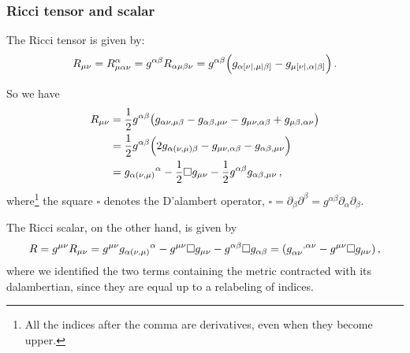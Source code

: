 \documentclass[main.tex]{subfiles}
\begin{document}
\subsubsection{Ricci tensor and scalar}

The Ricci tensor is given by: 
%
\begin{equation}
  R_{\mu \nu } = R^{\alpha }_{\mu \alpha \nu } 
  = g^{\alpha \beta }R_{\alpha \mu \beta \nu }
  = g^{\alpha \beta }\qty(g_{\alpha [\nu|, \mu | \beta ]} - g_{\mu [\nu|, \alpha | \beta ]})
\,.
\end{equation}
%


So we have 
%
\begin{subequations}
    \begin{align}
    R_{\mu \nu }
    &= \frac{1}{2} g^{\alpha \beta }\qty(
      g_{\alpha \nu , \mu \beta }
      -g_{\alpha \beta , \mu \nu }
      - g_{\mu \nu , \alpha \beta }
      + g_{\mu \beta , \alpha \nu }
    )  \\
    &= \frac{1}{2} g^{\alpha \beta }\qty(
      2 g_{\alpha (\nu , \mu ) \beta }
      - g_{\mu \nu , \alpha \beta }
      - g_{\alpha \beta , \mu \nu }
    )  \\
    &= g_{\alpha (\nu , \mu )}\,\!^{\alpha } 
    - \frac{1}{2} \square g_{\mu \nu }
    - \frac{1}{2} g^{\alpha \beta }g_{\alpha \beta , \mu \nu }
    \label{eq:Ricci-tensor-LIF}
\,,
\end{align}
\end{subequations}
%
where\footnote{All the indices after the comma are derivatives, even when they become upper.} the square \(\square\) denotes the D'alambert operator, \(\square = \partial_{\beta }\partial^{\beta } = g^{\alpha \beta }\partial_{\alpha }\partial_{\beta }\).

The Ricci scalar, on the other hand, is given by 
%
\begin{equation} \label{eq:ricci-scalar-LIF} 
  R = g^{\mu \nu }R_{\mu \nu }
  =  g^{\mu \nu }g_{\alpha (\nu , \mu )}\,\!^{\alpha }
  -  g^{\mu \nu }\square g_{\mu \nu }
  - g^{\alpha \beta } \square g_{\alpha \beta }
  = (\tensor{g}{_{\alpha \nu }^{, \alpha \nu }}
   -g^{\mu \nu } \square g_{\mu \nu })
\,,
\end{equation}
%
where we identified the two terms containing the metric contracted with its dalambertian, since they are equal up to a relabeling of indices.
\end{document}
